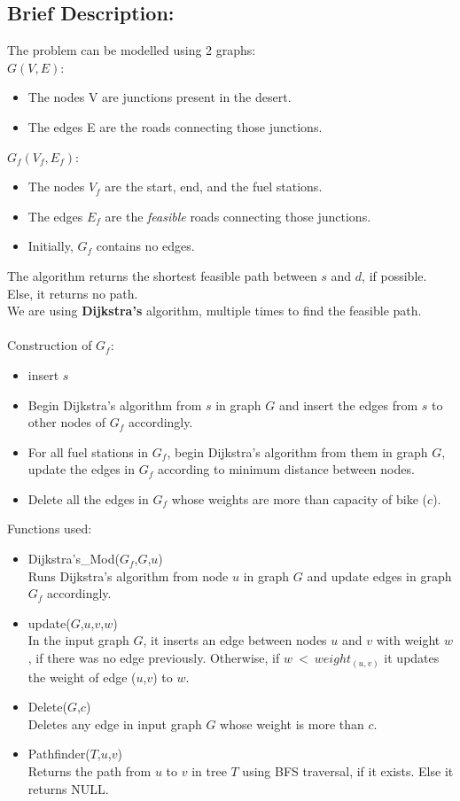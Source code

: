 \documentclass[pdftex,a4paper,12pt]{report}
\begin{document}
\subsection{Brief Description:}
The problem can be modelled using 2 graphs:\\
$G(V,E)$: 
\begin{itemize}
\item The nodes V are junctions present in the desert.
\item The edges E are the roads connecting those junctions.
\end{itemize}
$G_{f}(V_{f},E_{f})$:
\begin{itemize}
\item The nodes $V_{f}$ are the start, end, and the fuel stations.
\item The edges $E_{f}$ are the \emph{feasible} roads connecting those junctions.
\item Initially, $G_{f}$ contains no edges.
\end{itemize}
The algorithm returns the shortest feasible path between $s$ and $d$, if possible. Else, it returns no path.
\\
We are using \textbf{Dijkstra's} algorithm, multiple times to find the feasible path.
\\\\
Construction of $G_{f}$:
\begin{itemize}
\item insert $s$
\item Begin Dijkstra's algorithm from $s$ in graph $G$ and insert the edges from $s$ to other nodes of $G_{f}$ accordingly.
\item For all fuel stations in $G_{f}$, begin Dijkstra's algorithm from them in graph $G$, update the edges in $G_{f}$ according to minimum distance between nodes.
\item Delete all the edges in $G_{f}$ whose weights are more than capacity of bike ($c$).
\end{itemize}


Functions used:
\begin{itemize}
\item Dijkstra's\_Mod($G_{f}$,$G$,$u$)
\\
Runs Dijkstra's algorithm from node $u$ in graph $G$ and update edges in graph $G_{f}$ accordingly.
\item update($G$,$u$,$v$,$w$)
\\
In the input graph $G$, it inserts an edge between nodes $u$ and $v$ with weight $w$, if there was no edge previously. Otherwise, if $w\ <\ weight_{(u,v)}$ it updates the weight of edge ($u$,$v$) to $w$.
\item Delete($G$,$c$)
\\
Deletes any edge in input graph $G$ whose weight is more than $c$.
\item Pathfinder($T$,$u$,$v$)
\\
Returns the path from $u$ to $v$ in tree $T$ using BFS traversal, if it exists. Else it returns NULL. 
\end{itemize}
\end{document}
